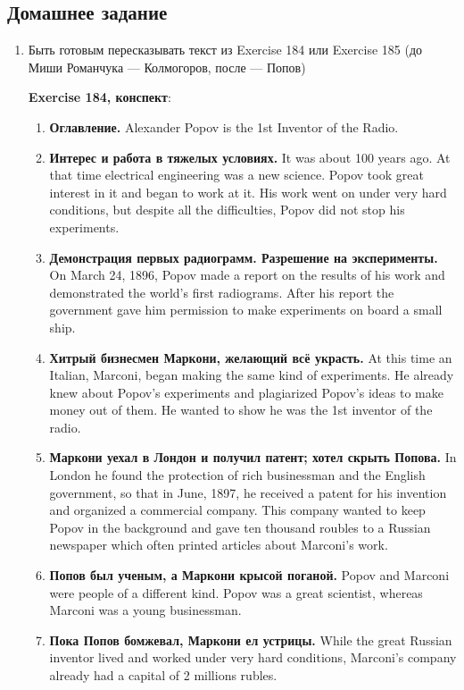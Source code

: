 \documentclass{article}
\begin{document}
\subsection{Домашнее задание}

\begin{enumerate}
    \item Быть готовым пересказывать текст из Exercise 184 или Exercise 185 (до Миши Романчука — Колмогоров, после — Попов)
    
    \textbf{Exercise 184, конспект}: 
    
    \begin{enumerate}
        \item \textbf{Оглавление.} Alexander Popov is the 1st Inventor of the Radio.
        \item \textbf{Интерес и работа в тяжелых условиях.} It was about 100 years ago. At that time electrical engineering was a new science. Popov took great interest in it and began to work at it. His work went on under very hard conditions, but despite all the difficulties, Popov did not stop his experiments.
        \item \textbf{Демонстрация первых радиограмм. Разрешение на эксперименты.} On March 24, 1896, Popov made a report on the results of his work and demonstrated the world's first radiograms. After his report the government gave him permission to make experiments on board a small ship.
        \item \textbf{Хитрый бизнесмен Маркони, желающий всё украсть.} At this time an Italian, Marconi, began making the same kind of experiments. He already knew about Popov's experiments and plagiarized Popov's ideas to make money out of them. He wanted to show he was the 1st inventor of the radio.
        \item \textbf{Маркони уехал в Лондон и получил патент; хотел скрыть Попова.} In London he found the protection of rich businessman and the English government, so that in June, 1897, he received a patent for his invention and organized a commercial company. This company wanted to keep Popov in the background and gave ten thousand roubles to a Russian newspaper which often printed articles about Marconi's work.
        \item \textbf{Попов был ученым, а Маркони крысой поганой.} Popov and Marconi were people of a different kind. Popov was a great scientist, whereas Marconi was a young businessman.
        \item \textbf{Пока Попов бомжевал, Маркони ел устрицы.} While the great Russian inventor lived and worked under very hard conditions, Marconi's company already had a capital of 2 millions rubles.

\end{enumerate}
\end{enumerate}
\end{document}

